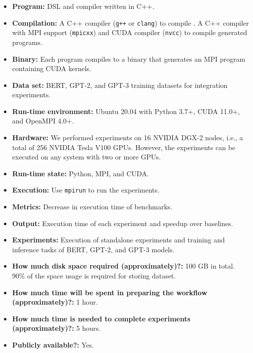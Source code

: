 {\small
\begin{itemize}
  \item {\bf Program:} \tool{} DSL and compiler written in C++.
  \item {\bf Compilation:} A C++ compiler (\texttt{g++} or \texttt{clang}) to compile \tool{}. A C++ compiler with MPI support (\texttt{mpicxx}) and CUDA compiler (\texttt{nvcc}) to compile generated programs.
  \item {\bf Binary:} Each \tool{} program compiles to a binary that generates an MPI program containing CUDA kernels.
  \item {\bf Data set:} BERT, GPT-2, and GPT-3 training datasets for integration experiments. 
  \item {\bf Run-time environment:} Ubuntu 20.04 with Python 3.7+, CUDA 11.0+, and OpenMPI 4.0+.
  \item {\bf Hardware:} We performed experiments on 16 NVIDIA DGX-2 nodes, i.e., a total of 256 NVIDIA Tesla V100 GPUs. 
  However, the experiments can be executed on any system with two or more GPUs.
  \item {\bf Run-time state:} Python, MPI, and CUDA.
  \item {\bf Execution:} Use \texttt{mpirun} to run the experiments.
  \item {\bf Metrics:} Decrease in execution time of benchmarks.
  \item {\bf Output:} Execution time of each experiment and \tool{} speedup over baselines.
  \item {\bf Experiments:} Execution of standalone experiments and training and inference tasks of BERT, GPT-2, and GPT-3 models.
  \item {\bf How much disk space required (approximately)?:} 100 GB in total. 90\% of the space usage is required for storing dataset.
  \item {\bf How much time will be spent in preparing the workflow (approximately)?:} 1 hour.
  \item {\bf How much time is needed to complete experiments (approximately)?:} 5 hours.
  \item {\bf Publicly available?:} Yes.
\end{itemize}
}

